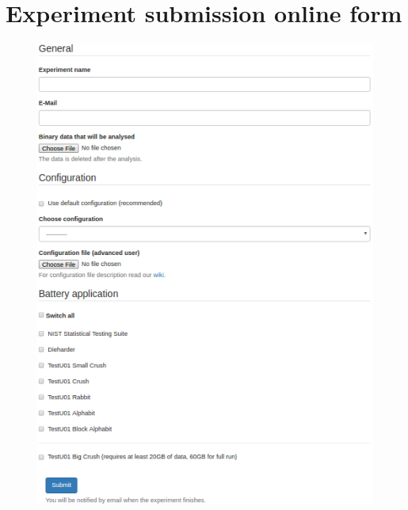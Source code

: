 \documentclass[
  digital,  	%
  color,		%
  oneside,   	%
  12pt,
  nocover,
  notable,
  nolof,
  nolot,
]{fithesis3}
\theoremstyle{definition}
\theoremstyle{remark}
\begin{document}
\chapter{Experiment submission online form}
\label{chap:exp_submit_form}

\begin{figure}[h!]
\begin{nomar}
\centering
\includegraphics[width=\textwidth+1.2cm]{figures/submit-experiment-form.png} 
\end{nomar}
\end{figure}
\end{document}
